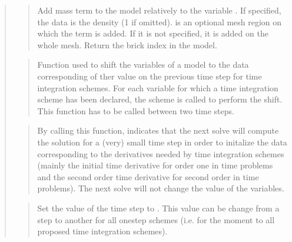 \documentclass[a4paper,11pt,english]{sphinxmanual}
\begin{document}
\begin{quote}
\sphinxAtStartPar
{}
\begin{quote}

\sphinxAtStartPar
Add mass term to the model relatively to the variable .
If specified, the data  is the
density (1 if omitted).  is an optional mesh region on
which the term is added. If it is not specified, it
is added on the whole mesh. Return the brick index in the model.
\end{quote}

\sphinxAtStartPar
{}
\begin{quote}

\sphinxAtStartPar
Function used to shift the variables of a model to the data
corresponding of ther value on the previous time step for time
integration schemes. For each variable for which a time integration
scheme has been declared, the scheme is called to perform the shift.
This function has to be called between two time steps.
\end{quote}

\sphinxAtStartPar
{}
\begin{quote}

\sphinxAtStartPar
By calling this function, indicates that the next solve will compute
the solution for a (very) small time step  in order to initalize
the data corresponding to the derivatives needed by time integration
schemes (mainly the initial time derivative for order one in time
problems  and the second order time derivative for second order in time
problems). The next solve will not change the value of the variables.
\end{quote}

\sphinxAtStartPar
{}
\begin{quote}

\sphinxAtStartPar
Set the value of the time step to . This value can be change
from a step to another for all one\sphinxhyphen{}step schemes (i.e. for the moment
to all proposed time integration schemes).
\end{quote}


\end{quote}
\end{document}
